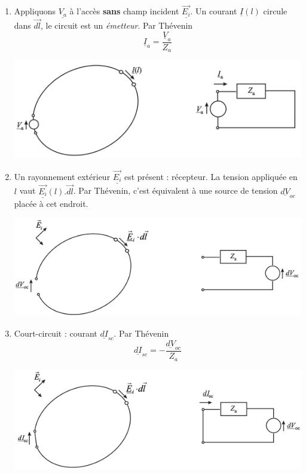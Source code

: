 	\begin{enumerate}
	\item Appliquons $\underline{V_a}$ à l'accès \textbf{sans} champ incident $\underline{\vec{E_i}}$. 
	Un courant $\underline{I}(l)$ circule dans $\vec{dl}$, le circuit est un \textit{émetteur}. Par 
	Thévenin 
	\begin{equation}
	\underline{I}_a = \dfrac{\underline{V}_a}{Z_a}
	\end{equation}
		\begin{center}
	\includegraphics[scale=0.45]{ch4/image5.png}
	\end{center}
	\item Un rayonnement extérieur $\underline{\vec{E_i}}$ est présent : récepteur. La tension appliquée 
	en $l$ vaut $\underline{\vec{E_i}}(l).\vec{dl}$. Par Thévenin, c'est équivalent à une source de 
	tension $\underline{dV}_{oc}$ placée à cet endroit.
			\begin{center}
	\includegraphics[scale=0.45]{ch4/image6.png}
	\end{center}
	\item Court-circuit : courant $\underline{dI}_{sc}$. Par Thévenin
	\begin{equation}
	\underline{dI}_{sc} = -\dfrac{\underline{dV}_{oc}}{Z_a}
	\end{equation}
			\begin{center}
	\includegraphics[scale=0.45]{ch4/image7.png}
	\end{center}
	\end{enumerate}
